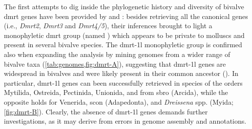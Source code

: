 The first attempts to dig inside the phylogenetic history and diversity of bivalve \gls{dmrt} genes have been provided by  and : besides retrieving all the canonical genes (i.e., \textit{Dmrt2}, \textit{Dmrt3} and \textit{Dmrt4/5}), their inferences brought to light a monophyletic \gls{dmrt} group (named ) which appears to be private to molluscs and present in several bivalve species. The \gls{dmrt-1l} monophyletic group is confirmed also when expanding the analysis by mining genomes from a wider range of bivalve taxa (\cref{tab:genomes,fig:dmrt-A}), suggesting that \gls{dmrt-1l} genes are widespread in bivalves and were likely present in their common ancestor (). In particular, \gls{dmrt-1l} genes can been successfully retrieved in species of the orders Mytilida, Ostreida, Pectinida, Unionida, and from \gls{sbro} (Arcida), while the opposite holds for Venerida, \gls{scon} (Adapedonta), and \textit{Dreissena} spp. (Myida; \cref{fig:dmrt-B}). Clearly, the absence of \gls{dmrt-1l} genes demands further investigations, as it may derive from errors in genome assembly and annotations.

